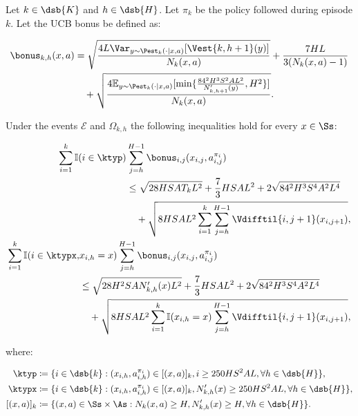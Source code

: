 \begin{lemma}
\label{lem:sum_b}
Let $k \in \dsb{K}$ and $h \in \dsb{H}$. Let $\pi_k$ be the policy followed during episode $k$. Let the UCB bonus be defined as:

\begin{align*}
    \bonus_{k,h}(x,a) &= \sqrt{\frac{4 L \Var_{y \sim \Pest_k (\cdot | x,a)} [\Vest{k,h+1}(y)]}{N_k(x,a)}} + \frac{7HL}{3 (N_k(x,a) - 1)} \\
    &\quad + \sqrt{\frac{4 \mathbb{E}_{y \sim \Pest_k(\cdot|x,a)} [\min\{ \frac{84^2H^3S^2AL^2}{N'_{k,h+1}(y)} , H^2\}]}{N_k (x,a)}}.
\end{align*}

Under the events $\mathcal{E}$ and $\Omega_{k,h}$ the following inequalities hold for every $x \in \Ss$:

\begin{align}
    \begin{split}
    \label{lem:sum_b:1}
    \sum_{i=1}^k \mathbb{I}(i \in \ktyp) &\sum_{j=h}^{H-1} \bonus_{i,j}(x_{i,j}, a_{i,j}^{\pi_i}) \\
    &\le \sqrt{28 HSAT_kL^2} + \frac{7}{3} HSAL^2 + 2 \sqrt{84^2 H^3 S^4 A^2 L^4}\\
    &\quad + \sqrt{8 HSAL^2 \sum_{i=1}^k \sum_{j=h}^{H-1} \Vdifftil{i,j+1}(x_{i,j+1})},
    \end{split} \\
    \begin{split}
    \label{lem:sum_b:2}
    \sum_{i=1}^k \mathbb{I}(i \in \ktypx, &x_{i,h}=x) \sum_{j=h}^{H-1} \bonus_{i,j}(x_{i,j}, a_{i,j}^{\pi_i}) \\
    &\le \sqrt{28 H^2SA N'_{k,h}(x) L^2} + \frac{7}{3} HSAL^2 + 2 \sqrt{84^2 H^3 S^4 A^2 L^4} \\
    &\quad + \sqrt{8 HSAL^2 \sum_{i=1}^k \mathbb{I}(x_{i,h}=x) \sum_{j=h}^{H-1} \Vdifftil{i,j+1}(x_{i,j+1})},
    \end{split}
\end{align}

where:

\begin{align*}
    \ktyp &\coloneqq \{ i\in\dsb{k} : (x_{i,h}, a_{i,h}^{\pi_i}) \in [(x,a)]_k, i \ge 250 H S^2 A L, \forall h \in \dsb{H} \}, \\
    \ktypx &\coloneqq \{ i \in \dsb{k} : (x_{i,h}, a_{i,h}^{\pi_i}) \in [(x,a)]_k, N'_{k,h}(x) \ge 250 H S^2 A L, \forall h \in \dsb{H} \}, \\
    [(x,a)]_k &\coloneqq \{ (x,a) \in \Ss \times \As : N_k (x,a) \ge H, N'_{k,h}(x) \ge H, \forall h \in \dsb{H} \}.
\end{align*}
\end{lemma}

